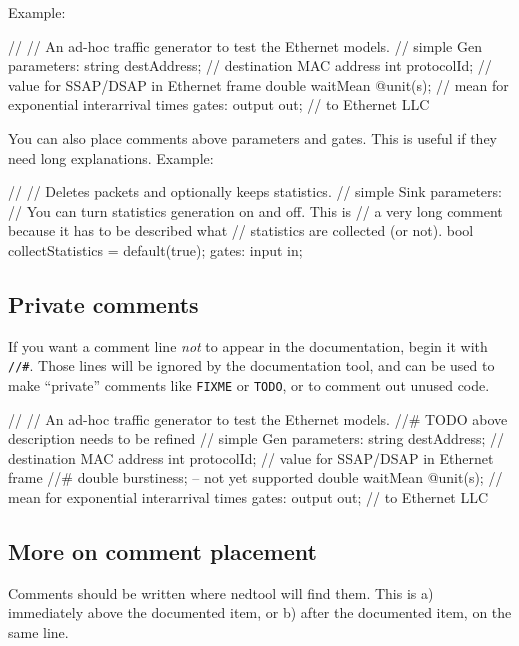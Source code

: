 Example:

\begin{ned}
//
// An ad-hoc traffic generator to test the Ethernet models.
//
simple Gen
{
    parameters:
        string destAddress;  // destination MAC address
        int protocolId;      // value for SSAP/DSAP in Ethernet frame
        double waitMean @unit(s); // mean for exponential interarrival times
    gates:
        output out;  // to Ethernet LLC
}
\end{ned}

You can also place comments above parameters and gates. This is useful
if they need long explanations. Example:

\begin{ned}
//
// Deletes packets and optionally keeps statistics.
//
simple Sink
{
    parameters:
        // You can turn statistics generation on and off. This is
        // a very long comment because it has to be described what
        // statistics are collected (or not).
        bool collectStatistics = default(true);
    gates:
        input in;
}
\end{ned}

\subsection{Private comments}

If you want a comment line \textit{not} to appear in the documentation,
begin it with \texttt{//\#}. Those lines will be ignored by the
documentation tool, and can be used to make ``private'' comments
like \texttt{FIXME} or \texttt{TODO}, or to comment out unused code.

\begin{ned}
//
// An ad-hoc traffic generator to test the Ethernet models.
//# TODO above description needs to be refined
//
simple Gen
{
    parameters:
        string destAddress;  // destination MAC address
        int protocolId;      // value for SSAP/DSAP in Ethernet frame
        //# double burstiness;  -- not yet supported
        double waitMean @unit(s); // mean for exponential interarrival times
    gates:
        output out;  // to Ethernet LLC
}
\end{ned}


\subsection{More on comment placement}

Comments should be written where nedtool will find them.
This is a) immediately above the documented item, or b) after the
documented item, on the same line.

